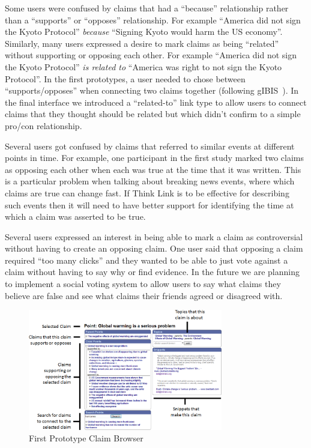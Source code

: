 \documentclass{chi2009}
\begin{document}
Some users were confused by claims that had a ``because'' relationship rather than a ``supports'' or ``opposes'' relationship. For example ``America did not sign the Kyoto Protocol'' {\it because} ``Signing Kyoto would harm the US economy''. Similarly, many users expressed a desire to mark claims as being ``related'' without supporting or opposing each other. For example ``America did not sign the Kyoto Protocol'' {\it is related to} ``America was right to not sign the Kyoto Protocol''. In the first prototypes, a user needed to chose between ``supports/opposes'' when connecting two claims together (following gIBIS~\cite{Conklin1987a}). In the final interface we introduced a ``related-to'' link type to allow users to connect claims that they thought should be related but which didn't confirm to a simple pro/con relationship. 

Several users got confused by claims that referred to similar events at different points in time. 
For example, one participant in the first study marked two claims as opposing each other when each was true at the time that it was written.  %
This is a particular problem when talking about breaking news events, where which claims are true can change fast.  %
If Think Link is to be effective for describing such events then it will need to have better support for identifying the time at which a claim was asserted to be true. %

Several users expressed an interest in being able to mark a claim as controversial without having to create an opposing claim. One user said that opposing a claim required ``too many clicks'' and they wanted to be able to just vote against a claim without having to say why or find evidence. In the future we are planning to implement a social voting system to allow users to say what claims they believe are false and see what claims their friends agreed or disagreed with.

\begin{figure}[tb]
	\includegraphics[width=8.5cm]{../screenshots/oldpoint_diagram.png}
	\caption{First Prototype Claim Browser}
	\label{oldbrowser}
\end{figure}
\end{document}
